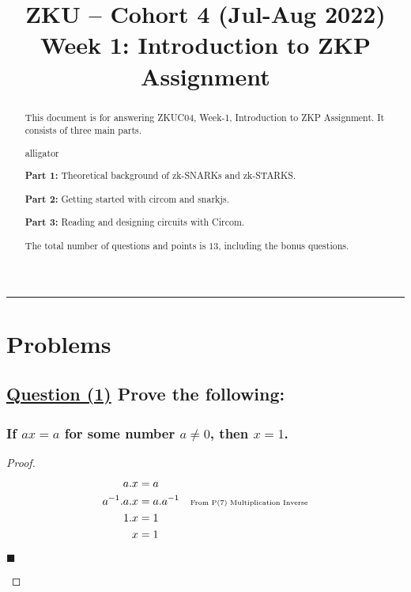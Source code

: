 \documentclass[letterpaper, 10 pt, conference]{ieeeconf}  %
\title{\LARGE \bf
ZKU – Cohort 4 (Jul-Aug 2022)\\Week 1: Introduction to ZKP\\Assignment \sharp 1}
\author{Iskander Andrews$^{1}$%
\thanks{\faIcon[regular]{envelope} \tt\small iskander.s.andrews@gmail.com}
\thanks{\faIcon{discord} \tt\small Isk#0996}
\thanks{\faIcon{github} \tt\small iskdrews}}
\begin{document}
\maketitle
\thispagestyle{empty}
\pagestyle{empty}


\begin{abstract}

This document is for answering ZKUC04, Week-1, Introduction to ZKP Assignment.
It consists of three main parts.
\begin{labeling}{alligator}
\item [\textbf{Part 1:}] Theoretical background of zk-SNARKs and zk-STARKS.
\item [\textbf{Part 2:}] Getting started with circom and snarkjs.
\item [\textbf{Part 3:}] Reading and designing circuits with Circom.
\end{labeling}

The total number of questions and points is $13$, including the bonus questions. 
\end{abstract}

\noindent\rule{8cm}{0.4pt}

\section{\textbf{Problems}}
\subsection{\textbf{\underline{Question (1)} Prove the following:}}
\subsubsection{\textbf{If $ax = a$ for some number $a \neq 0$, then $x = 1$.}}

\renewcommand\qedsymbol{$\blacksquare$}

\begin{proof}
\begin{align}
a.x& = a && \text{}\\
a^{-1}.a.x& = a.a^{-1} && \text{\tiny{From P(7) Multiplication Inverse}}\\
1.x& = 1 && \text{}\\
x& = 1 && 
\end{align}

\begin{flushright}
$\blacksquare$
\end{flushright}
\end{proof}
\end{document}
